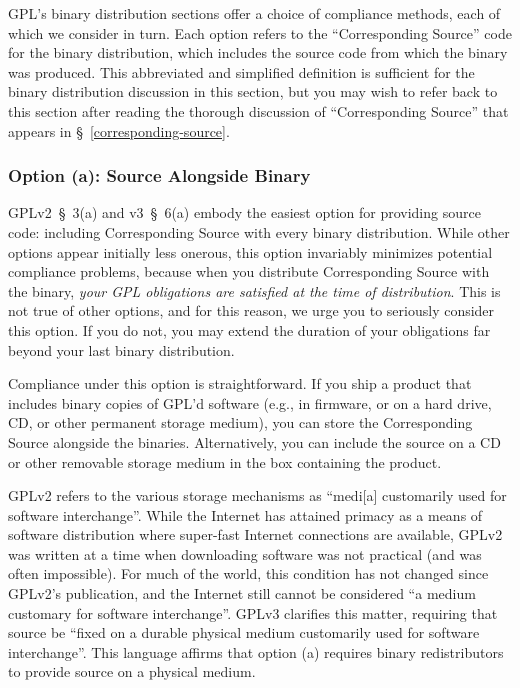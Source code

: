 \documentclass[letterpaper]{fixme}
\begin{document}
GPL's binary distribution sections offer a choice of compliance methods,
each of which we consider in turn.  Each option refers to the
``Corresponding Source'' code for the binary distribution, which includes
the source code from which the binary was produced.  This abbreviated and
simplified definition is sufficient for the binary distribution discussion
in this section, but you may wish to refer back to this section after
reading the thorough discussion of ``Corresponding Source'' that appears
in \S~\ref{corresponding-source}.

\subsubsection{Option (a): Source Alongside Binary}

GPLv2~\S~3(a) and v3~\S~6(a) embody the easiest option for providing
source code: including Corresponding Source with every binary
distribution.  While other options appear initially less onerous, this
option invariably minimizes potential compliance problems, because when
you distribute Corresponding Source with the binary, \emph{your GPL
  obligations are satisfied at the time of distribution}.  This is not
true of other options, and for this reason, we urge you to seriously
consider this option.  If you do not, you may extend the duration of your
obligations far beyond your last binary distribution.

Compliance under this option is straightforward.  If you ship a product
that includes binary copies of GPL'd software (e.g., in firmware, or on a
hard drive, CD, or other permanent storage medium), you can store the
Corresponding Source alongside the binaries.  Alternatively, you can
include the source on a CD or other removable storage medium in the box
containing the product.

GPLv2 refers to the various storage mechanisms as ``medi[a] customarily
used for software interchange''.  While the Internet has attained primacy
as a means of software distribution where super-fast Internet connections
are available, GPLv2 was written at a time when downloading software was
not practical (and was often impossible).  For much of the world, this
condition has not changed since GPLv2's publication, and the Internet
still cannot be considered ``a medium customary for software
interchange''.  GPLv3 clarifies this matter, requiring that source be
``fixed on a durable physical medium customarily used for software
interchange''.  This language affirms that option (a) requires binary
redistributors to provide source on a physical medium.
\end{document}
